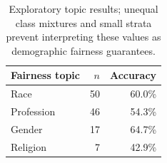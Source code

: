 \begin{table}[H]\centering\small
\begin{tabular}{lrr}
\toprule
Fairness topic & $n$ & Accuracy\\
\midrule
Race & 50 & 60.0\%\\
Profession & 46 & 54.3\%\\
Gender & 17 & 64.7\%\\
Religion & 7 & 42.9\%\\
\bottomrule\end{tabular}
\caption{Exploratory topic results; unequal class mixtures and small strata prevent interpreting these values as demographic fairness guarantees.}
\end{table}

